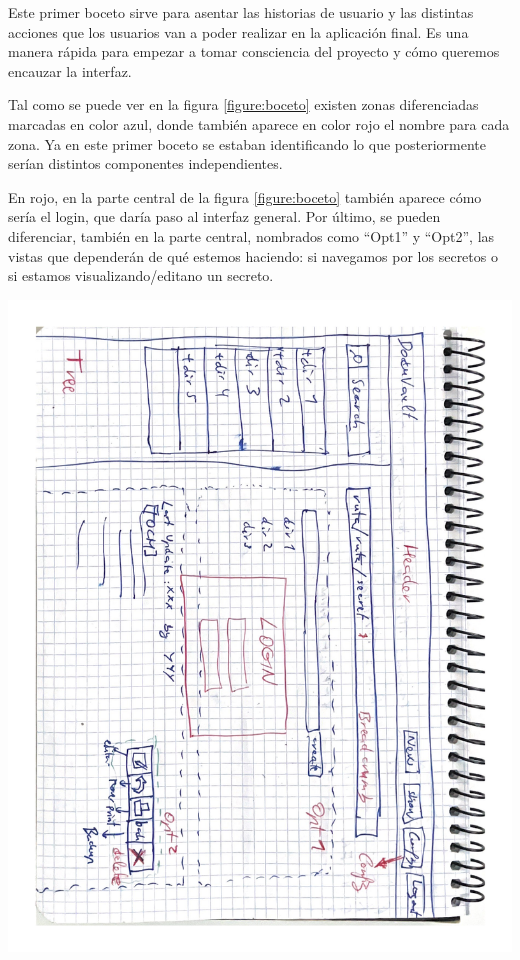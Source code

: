 \documentclass{\ClassPath/viu-tfm-template}
\begin{document}
Este primer boceto sirve para asentar las historias de usuario y las distintas acciones que los usuarios van a poder realizar en la aplicación final. Es una manera rápida para empezar a tomar consciencia del proyecto y cómo queremos encauzar la interfaz.

Tal como se puede ver en la figura \ref{figure:boceto} existen zonas diferenciadas marcadas en color azul, donde también aparece en color rojo el nombre para cada zona. Ya en este primer boceto se estaban identificando lo que posteriormente serían distintos componentes independientes.

En rojo, en la parte central de la figura \ref{figure:boceto} también aparece cómo sería el login, que daría paso al interfaz general. Por último, se pueden diferenciar, también en la parte central, nombrados como “Opt1” y “Opt2”, las vistas que dependerán de qué estemos haciendo: si navegamos por los secretos o si estamos visualizando/editano un secreto.

\begin{center}
    \vspace{-20pt}
    \includegraphics[angle=90, clip, trim=1.88cm 0cm 1cm 0cm, width=0.9\linewidth]{img/boceto.pdf}
    \vspace{-5pt}
    \label{figure:boceto}
\end{center}
\end{document}
